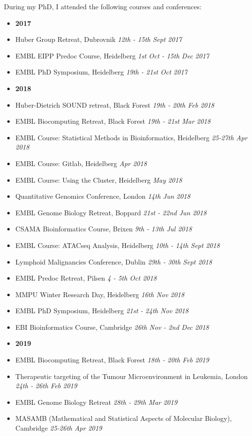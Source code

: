 \documentclass[11pt, a4paper, twosided]{book}
\begin{document}
    During my PhD, I attended the following courses and conferences:
    \begin{itemize}
      \item \textbf{2017}
      \item Huber Group Retreat, Dubrovnik \textit{12th - 15th Sept 2017}
      \item EMBL EIPP Predoc Course, Heidelberg \textit{1st Oct - 15th Dec 2017}
      \item EMBL PhD Symposium, Heidelberg \textit{19th - 21st Oct 2017}
      \item \textbf{2018}
      \item Huber-Dietrich SOUND retreat, Black Forest \textit{19th - 20th Feb 2018}
      \item EMBL Biocomputing Retreat, Black Forest \textit{19th - 21st Mar 2018}
      \item EMBL Course: Statistical Methods in Bioinformatics, Heidelberg \textit{25-27th Apr 2018}
      \item EMBL Course: Gitlab, Heidelberg \textit{Apr 2018}
      \item EMBL Course: Using the Cluster, Heidelberg \textit{May 2018}
      \item Quantitative Genomics Conference, London \textit{14th Jun 2018}
      \item EMBL Genome Biology Retreat, Boppard \textit{21st - 22nd Jun 2018}
      \item CSAMA Bioinformatics Course, Brixen \textit{9th - 13th Jul 2018}
      \item EMBL Course: ATACseq Analysis, Heidelberg \textit{10th - 14th Sept 2018}
      \item Lymphoid Malignancies Conference, Dublin \textit{29th - 30th Sept 2018}
      \item EMBL Predoc Retreat, Pilsen \textit{4 - 5th Oct 2018}
      \item MMPU Winter Research Day, Heidelberg \textit{16th Nov 2018}
      \item EMBL PhD Symposium, Heidelberg \textit{21st - 24th Nov 2018}
      \item EBI Bioinformatics Course, Cambridge \textit{26th Nov - 2nd Dec 2018}
      \item \textbf{2019}
      \item EMBL Biocomputing Retreat, Black Forest \textit{18th - 20th Feb 2019}
      \item Therapeutic targeting of the Tumour Microenvironment in Leukemia, London
    \textit{24th - 26th Feb 2019}
      \item EMBL Genome Biology Retreat \textit{28th - 29th Mar 2019}
      \item MASAMB (Mathematical and Statistical Aspects of Molecular Biology),
    Cambridge \textit{25-26th Apr 2019}


\end{itemize}
\end{document}

